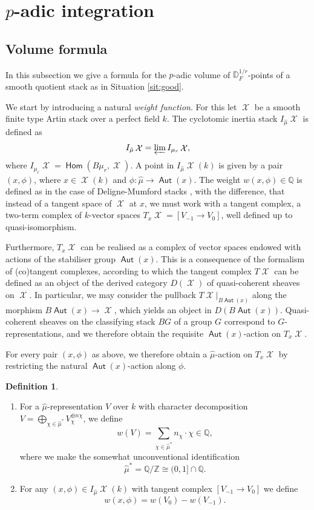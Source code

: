 \documentclass{article}
\DeclareMathOperator{\Xc}{\mathcal{X}}
\DeclareMathOperator{\Hom}{\mathsf{Hom}}
\DeclareMathOperator{\Aut}{\mathsf{Aut}}
\newcommand{\BQ}{{\mathbb{Q}}}
\newcommand{\BZ}{{\mathbb{Z}}}
\newcommand{\Dr}[1][r]{\mathbb{D}_F^{1/#1}}
\theoremstyle{definition}
\newtheorem{definition}{Definition}[section]
\theoremstyle{plain}
\begin{document}
\section{$p$-adic integration}\label{pins}

\subsection{Volume formula}\label{vol-for}


In this subsection we give a formula for the $p$-adic volume of $\Dr[r]$-points of a smooth quotient stack as in Situation \ref{sit:good}. 

We start by introducing a natural \textit{weight function}. For this let $\Xc$ be a smooth finite type Artin stack over a perfect field $k$. The cyclotomic inertia stack $I_{\hat{\mu}}\Xc$ is defined as
\[I_{\hat{\mu}}\Xc = \varprojlim I_{\mu_r} \Xc,\]
where $I_{\mu_r} \Xc = \Hom(B{\mu_r}, \Xc)$.
A point in $I_{\hat{\mu}}\Xc(k)$ is given by a pair $(x,\phi)$, where $x \in \Xc(k)$ and $\phi:\hat{\mu} \to \Aut(x)$. The weight $w(x,\phi) \in \BQ$ is defined as in the case of Deligne-Mumford stacks \cite[Definition 2.20]{GWZ20b}, with the difference, that instead of a tangent space of $\Xc$ at $x$, we must work with a tangent complex, a two-term complex of $k$-vector spaces $T_x\Xc = [V_{-1} \to V_0]$, well defined up to quasi-isomorphism. 

Furthermore, $T_x\Xc$ can be realised as a complex of vector spaces endowed with actions of the stabiliser group $\Aut(x)$. This is a consequence of the formalism of (co)tangent complexes, according to which the tangent complex $T\Xc$ can be defined as an object of the derived category $D(\Xc)$ of quasi-coherent sheaves on $\Xc$. In particular, we may consider the pullback $T\Xc|_{B\Aut(x)}$ along the morphism $B\Aut(x) \to \Xc$, which yields an object in $D(B\Aut(x))$. Quasi-coherent sheaves on the classifying stack $BG$ of a group $G$ correspond to $G$-representations, and we therefore obtain the requisite $\Aut(x)$-action on $T_x\Xc$.

For every pair $(x,\phi)$ as above, we therefore obtain a $\hat{\mu}$-action on $T_x\Xc$ by restricting the natural $\Aut(x)$-action along $\phi$.

\begin{definition}\label{weightf}
    \begin{enumerate}
    
        \item For a $\hat\mu$-representation $V$ over $k$ with character decomposition $V=\bigoplus_{\chi \in \hat\mu^*}{V^{\oplus n\chi}_\chi}$, we define 
    \[w(V) =  \sum_{\chi \in  \hat\mu^* } n_\chi \cdot \chi \in \BQ,\]
    where we make the somewhat unconventional identification
    \[\hat\mu^* = \BQ/\BZ \cong (0,1] \cap \BQ.\]
    \item For any $(x,\phi) \in I_{\hat{\mu}}\Xc(k)$ with tangent complex $[V_{-1} \to V_0]$ we define 
    \[w(x,\phi) = w(V_0)-w(V_{-1}).\]
    \end{enumerate}
\end{definition}
\end{document}
